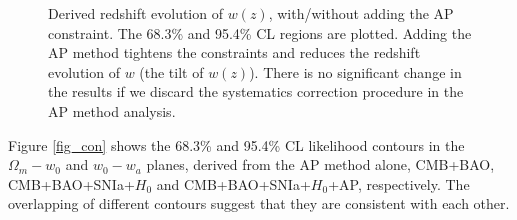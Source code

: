 \documentclass[iop]{emulateapj}
\begin{document}
\begin{figure}
   \caption{\label{fig_wz}
   Derived redshift evolution of $w(z)$, with/without adding the AP constraint.
   The 68.3\% and 95.4\% CL regions are plotted.
   Adding the AP method tightens the constraints and reduces the redshift evolution of $w$ (the tilt of $w(z)$).
   There is no significant change in the results if we discard the systematics correction procedure in the AP method analysis.
   }
\end{figure}





Figure \ref{fig_con} shows the 68.3\% and 95.4\% CL likelihood contours in the $\Omega_m - w_0$  and $w_0 - w_a$ planes,
derived from the AP method alone, CMB+BAO, CMB+BAO+SNIa+$H_0$
and CMB+BAO+SNIa+$H_0$+AP, respectively.
The overlapping of different contours suggest that they are consistent with each other.
\end{document}

